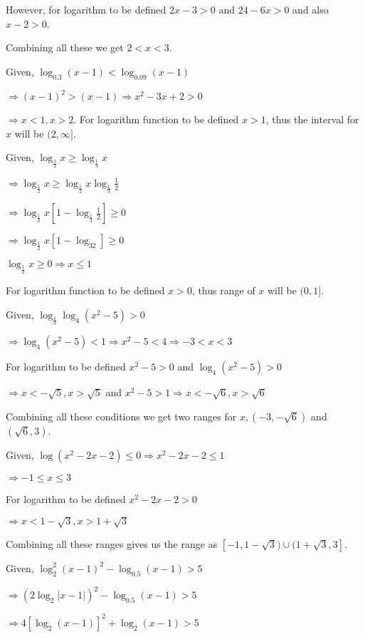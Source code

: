   However, for logarithm to be defined $2x - 3 > 0$ and $24 - 6x > 0$ and also $x - 2 > 0$.

  Combining all these we get $2 < x < 3$.
\item Given, $\log_{0.3}(x - 1) < \log_{0.09}(x - 1)$

  $\Rightarrow (x - 1)^2 > (x - 1)\Rightarrow x^2 - 3x + 2 > 0$

  $\Rightarrow x < 1, x > 2$.
  For logarithm function to be defined $x > 1$, thus the interval for $x$ will be $(2,\infty]$.
\item Given, $\log_{\tfrac{1}{2}}x \geq \log_{\tfrac{1}{3}}x$

  $\Rightarrow \log_{\tfrac{1}{2}}x \geq \log_{\tfrac{1}{2}}x\log_{\tfrac{1}{3}}\frac{1}{2}$

  $\Rightarrow \log_{\tfrac{1}{2}}x\left[1 - \log_{\tfrac{1}{3}}\frac{1}{2}\right]\geq 0$

  $\Rightarrow \log_{\tfrac{1}{2}}x[1 - \log_32]\geq 0$

  $\log_{\tfrac{1}{2}}x \geq 0 \Rightarrow x\leq 1$

  For logarithm function to be defined $x > 0$, thus range of $x$ will be $(0, 1]$.
\item Given, $\log_{\tfrac{1}{3}}\log_4(x^2 - 5) > 0$

  $\Rightarrow \log_4(x^2 - 5) < 1 \Rightarrow x^2 - 5 < 4 \Rightarrow -3 < x < 3$

  For logarithm to be defined $x^2 - 5 > 0$ and $\log_4(x^2 - 5) > 0$

  $\Rightarrow x < -\sqrt{5}, x > \sqrt{5}$ and $x^2 - 5 > 1 \Rightarrow x < -\sqrt{6}, x > \sqrt{6}$

  Combining all these conditions we get two ranges for $x, (-3, -\sqrt{6})$ and $(\sqrt{6}, 3)$.
\item Given, $\log(x^2 -2x -2)\leq 0 \Rightarrow x^2 - 2x - 2 \leq 1$

  $\Rightarrow -1\leq x \leq 3$

  For logarithm to be defined $x^2 - 2x - 2 > 0$

  $\Rightarrow x < 1 - \sqrt{3}, x > 1 + \sqrt{3}$

  Combining all these ranges gives us the range as $[-1, 1-\sqrt{3})\cup(1 + \sqrt{3}, 3]$.
\item Given, $\log_2^2(x-1)^2 - \log_{0.5}(x - 1) > 5$

  $\Rightarrow (2\log_2|x - 1|)^2 - \log_{0.5}(x - 1) > 5$

  $\Rightarrow 4[\log_2(x - 1)]^2 + \log_2(x - 1) > 5$

